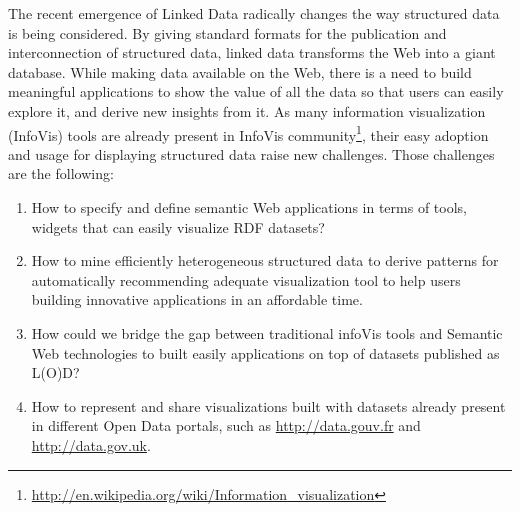 The recent emergence of Linked Data radically changes the way structured data is being considered. By giving standard formats for the publication and interconnection of structured data, linked data transforms the Web into a giant database. While making data available on the Web, there is a need to build meaningful applications to show the value of all the data so that users can easily explore it, and derive new insights from it. As many information visualization (InfoVis) tools are already present in InfoVis community\footnote{\url{http://en.wikipedia.org/wiki/Information_visualization}}, their easy adoption and usage for displaying structured data raise new challenges. Those challenges are the following:
\begin{enumerate}
 \item How to specify and define semantic Web applications in terms of tools, widgets that can easily visualize RDF datasets?
 \item How to mine efficiently heterogeneous structured data to derive patterns for automatically recommending adequate visualization tool to help users building innovative applications in an affordable time.
 \item How could we bridge the gap between traditional infoVis tools and Semantic Web technologies to built easily applications on top of datasets published as L(O)D?
 \item How to represent and share visualizations built with datasets already present in different Open Data portals, such as \url{http://data.gouv.fr} and \url{http://data.gov.uk}.
\end{enumerate}

\begin{figure}[ht!]
\end{figure}

